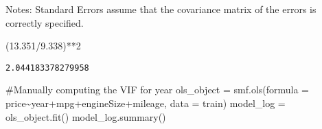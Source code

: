 \documentclass[
  letterpaper,
  DIV=11,
  numbers=noendperiod]{scrreprt}
\newenvironment{Shaded}{\begin{snugshade}}{\end{snugshade}}
\newcommand{\CommentTok}[1]{\textcolor[rgb]{0.37,0.37,0.37}{#1}}
\newcommand{\DecValTok}[1]{\textcolor[rgb]{0.68,0.00,0.00}{#1}}
\newcommand{\FloatTok}[1]{\textcolor[rgb]{0.68,0.00,0.00}{#1}}
\newcommand{\NormalTok}[1]{\textcolor[rgb]{0.00,0.23,0.31}{#1}}
\newcommand{\OperatorTok}[1]{\textcolor[rgb]{0.37,0.37,0.37}{#1}}
\newcommand{\StringTok}[1]{\textcolor[rgb]{0.13,0.47,0.30}{#1}}
\begin{document}
Notes: \newline
 [1] Standard Errors assume that the covariance matrix of the errors is correctly specified.

\begin{Shaded}
\begin{Highlighting}[]
\NormalTok{(}\FloatTok{13.351}\OperatorTok{/}\FloatTok{9.338}\NormalTok{)}\OperatorTok{**}\DecValTok{2}
\end{Highlighting}
\end{Shaded}

\begin{verbatim}
2.044183378279958
\end{verbatim}

\begin{Shaded}
\begin{Highlighting}[]
\CommentTok{\#Manually computing the VIF for year}
\NormalTok{ols\_object }\OperatorTok{=}\NormalTok{ smf.ols(formula }\OperatorTok{=} \StringTok{\textquotesingle{}price\textasciitilde{}year+mpg+engineSize+mileage\textquotesingle{}}\NormalTok{, data }\OperatorTok{=}\NormalTok{ train)}
\NormalTok{model\_log }\OperatorTok{=}\NormalTok{ ols\_object.fit()}
\NormalTok{model\_log.summary()}
\end{Highlighting}
\end{Shaded}
\end{document}
